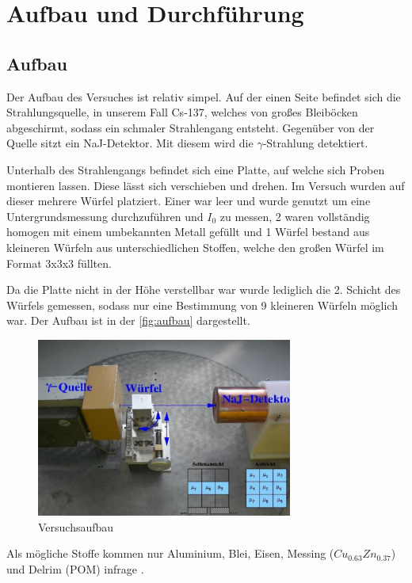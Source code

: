\section{Aufbau und Durchführung}

\subsection{Aufbau}
Der Aufbau des Versuches ist relativ simpel. Auf der einen Seite befindet sich die Strahlungsquelle, in unserem
Fall Cs-137, welches von großes Bleiböcken abgeschirmt, sodass ein schmaler Strahlengang entsteht. Gegenüber 
von der Quelle sitzt ein NaJ-Detektor. Mit diesem wird die $\gamma$-Strahlung detektiert. 

\noindent
Unterhalb des Strahlengangs befindet sich eine Platte, auf welche sich Proben montieren lassen. Diese lässt 
sich verschieben und drehen. Im Versuch wurden auf dieser mehrere Würfel platziert. Einer war leer und wurde genutzt um eine Untergrundsmessung durchzuführen und $I_0$ zu messen,
2 waren vollständig homogen mit einem umbekannten Metall gefüllt und 1 Würfel bestand aus kleineren Würfeln aus unterschiedlichen Stoffen, welche den großen Würfel 
im Format 3x3x3 füllten. 

\noindent
Da die Platte nicht in der Höhe verstellbar war wurde lediglich die 2. Schicht des Würfels gemessen, sodass nur eine Bestimmung von 9 kleineren Würfeln möglich war. Der Aufbau ist
in der \autoref{fig:aufbau} dargestellt.

\begin{figure}
    \centering
    \includegraphics[width=0.75\textwidth]{aufbau.png}
    \caption{Versuchsaufbau \cite{V14}}
    \label{fig:aufbau}
  \end{figure}

\noindent
Als mögliche Stoffe kommen nur Aluminium, Blei, Eisen, Messing ($Cu_{0.63}Zn_{0.37}$) und Delrim (POM) infrage \cite{V14}. 

